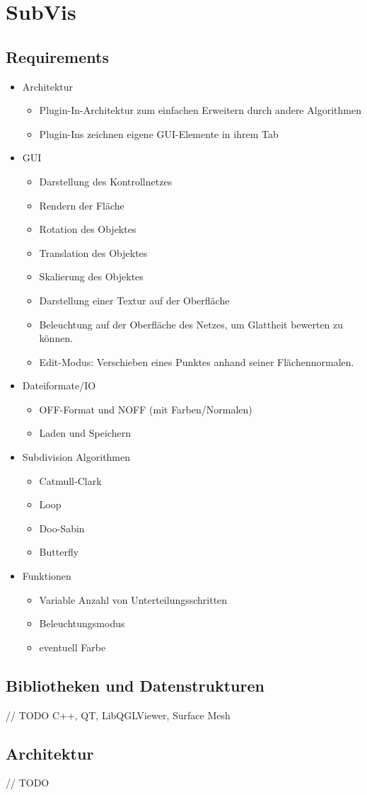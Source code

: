 \chapter{SubVis}


\section{Requirements}

\begin{itemize}
 \item Architektur
 \begin{itemize}
 	\item Plugin-In-Architektur zum einfachen Erweitern durch andere Algorithmen
 	\item Plugin-Ins zeichnen eigene GUI-Elemente in ihrem Tab
 \end{itemize}
 \item GUI
  \begin{itemize}
 	\item Darstellung des Kontrollnetzes
 	\item Rendern der Fläche
 	\item Rotation des Objektes 
 	\item Translation des Objektes
 	\item Skalierung des Objektes
 	\item Darstellung einer Textur auf der Oberfläche
 	\item Beleuchtung auf der Oberfläche des Netzes, um Glattheit bewerten zu können.
 	\item Edit-Modus: Verschieben eines Punktes anhand seiner Flächennormalen.
 \end{itemize}
 \item Dateiformate/IO
 \begin{itemize}
 	\item OFF-Format und NOFF (mit Farben/Normalen)
 	\item Laden und Speichern
 \end{itemize}
 \item Subdivision Algorithmen
 \begin{itemize}
 	\item Catmull-Clark
 	\item Loop
 	\item Doo-Sabin
 	\item Butterfly
 \end{itemize}
 \item Funktionen
 \begin{itemize}
  \item Variable Anzahl von Unterteilungsschritten
  \item Beleuchtungsmodus
  \item eventuell Farbe
 \end{itemize}
\end{itemize}

\section{Bibliotheken und Datenstrukturen}

// TODO C++, QT, LibQGLViewer, Surface Mesh

\section{Architektur}

// TODO

